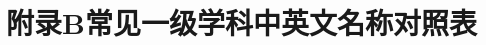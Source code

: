 
\chapter*{附录B\quad 常见一级学科中英文名称对照表}\label{附录B}	
\setcounter{equation}{0}
\setcounter{figure}{0}
\setcounter{table}{0} 
\renewcommand{\theequation}{B-\arabic{equation}}
\renewcommand{\thefigure}{B-\arabic{figure}}
\renewcommand{\thetable}{B-\arabic{table}}



